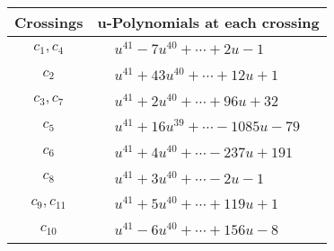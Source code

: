 \documentclass[1p]{elsarticle_modified}
\theoremstyle{definition}
\begin{document}
\begin{tabular}{m{50pt}|m{274pt}}
Crossings & \hspace{64pt}u-Polynomials at each crossing \\
\hline $$\begin{aligned}c_{1},c_{4}\end{aligned}$$&$\begin{aligned}
&u^{41}-7 u^{40}+\cdots+2 u-1
\end{aligned}$\\
\hline $$\begin{aligned}c_{2}\end{aligned}$$&$\begin{aligned}
&u^{41}+43 u^{40}+\cdots+12 u+1
\end{aligned}$\\
\hline $$\begin{aligned}c_{3},c_{7}\end{aligned}$$&$\begin{aligned}
&u^{41}+2 u^{40}+\cdots+96 u+32
\end{aligned}$\\
\hline $$\begin{aligned}c_{5}\end{aligned}$$&$\begin{aligned}
&u^{41}+16 u^{39}+\cdots-1085 u-79
\end{aligned}$\\
\hline $$\begin{aligned}c_{6}\end{aligned}$$&$\begin{aligned}
&u^{41}+4 u^{40}+\cdots-237 u+191
\end{aligned}$\\
\hline $$\begin{aligned}c_{8}\end{aligned}$$&$\begin{aligned}
&u^{41}+3 u^{40}+\cdots-2 u-1
\end{aligned}$\\
\hline $$\begin{aligned}c_{9},c_{11}\end{aligned}$$&$\begin{aligned}
&u^{41}+5 u^{40}+\cdots+119 u+1
\end{aligned}$\\
\hline $$\begin{aligned}c_{10}\end{aligned}$$&$\begin{aligned}
&u^{41}-6 u^{40}+\cdots+156 u-8
\end{aligned}$\\
\hline
\end{tabular}\\~\\
\end{document}
